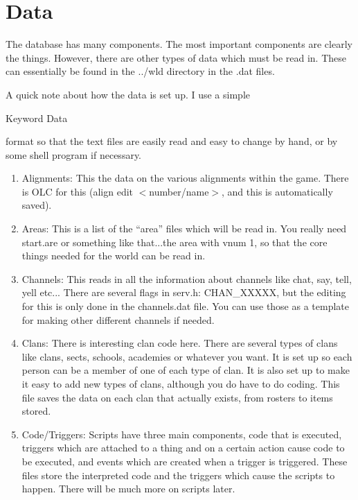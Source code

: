 \section{Data}

The database has many components. The most important components are clearly the things. However, there are other types of data which must be read in. These can essentially be found in the ../wld directory in the .dat files.

A quick note about how the data is set up. I use a simple 

Keyword Data

format so that the text files are easily read and easy to change by hand, or
 by some shell program if necessary.

\begin{enumerate}

\item Alignments: This the data on the various alignments within the
game. There is OLC for this (align edit $<$number/name$>$, and this is
automatically saved).

\item Areas: This is a list of the ``area'' files which will be read
in. You really need start.are or something like that...the area with
vnum 1, so that the core things needed for the world can be read in.

\item Channels: This reads in all the information about channels like
chat, say, tell, yell etc... There are several flags in serv.h:
CHAN\_XXXXX, but the editing for this is only done in the channels.dat
file. You can use those as a template for making other different
channels if needed.

\item Clans: There is interesting clan code here. There are several
types of clans like clans, sects, schools, academies or whatever you
want. It is set up so each person can be a member of one of each type
of clan. It is also set up to make it easy to add new types of clans,
although you do have to do coding. This file saves the data on each
clan that actually exists, from rosters to items stored.

\item Code/Triggers: Scripts have three main components, code that is
executed, triggers which are attached to a thing and on a certain
action cause code to be executed, and events which are created when a
trigger is triggered. These files store the interpreted code and the
triggers which cause the scripts to happen. There will be much more on
scripts later.


\end{enumerate}
